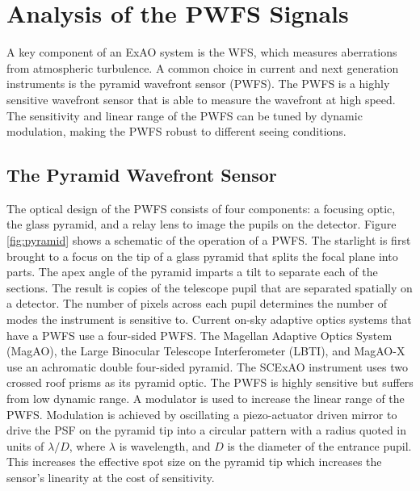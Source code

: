 \chapter{Analysis of the PWFS Signals}\label{CH2}

A key component of an ExAO system is the WFS, which measures aberrations from atmospheric turbulence.  A common choice in current and next generation instruments is the pyramid wavefront sensor (PWFS). The PWFS is a highly sensitive wavefront sensor that is able to measure the wavefront at high speed. The sensitivity and linear range of the PWFS can be tuned by dynamic modulation, making the PWFS robust to different seeing conditions. 
\section{The Pyramid Wavefront Sensor} 
The optical design of the PWFS consists of four components: a focusing optic, the glass pyramid, and a relay lens to image the pupils on the detector.\cite{ragazzoni2002pyramid} Figure \ref{fig:pyramid} shows a schematic of the operation of a PWFS.  The starlight is first brought to a focus on the tip of a glass pyramid that splits the focal plane into parts. The apex angle of the pyramid imparts a tilt to separate each of the sections. The result is copies of the telescope pupil that are separated spatially on a detector. The number of pixels across each pupil determines the number of modes the instrument is sensitive to. Current on-sky adaptive optics systems that have a PWFS use a four-sided PWFS. The Magellan Adaptive Optics System (MagAO)\cite{close2018status}, the Large Binocular Telescope Interferometer (LBTI)\cite{esposito2011adaptive}, and MagAO-X use an achromatic double four-sided pyramid. The SCExAO instrument uses two crossed roof prisms as its pyramid optic. The PWFS is highly sensitive but suffers from low dynamic range. A modulator is used to increase the linear range of the PWFS. Modulation is achieved by oscillating a piezo-actuator driven mirror to drive the PSF on the pyramid tip into a circular pattern with a radius quoted in units of $\lambda/D$, where $\lambda$ is wavelength, and $D$ is the diameter of the entrance pupil. This increases the effective spot size on the pyramid tip which increases the sensor's linearity at the cost of sensitivity.\cite{guyon2005}  

